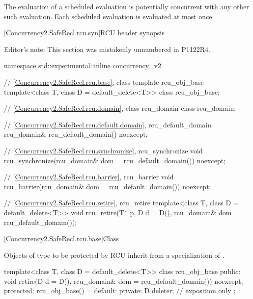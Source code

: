 \pnum
The evaluation of a scheduled evaluation is potentially concurrent with
any other such evaluation. Each scheduled evaluation is evaluated at
most once.

[Concurrency2.SafeRecl.rcu.syn]{RCU header  synopsis}

Editor's note: This section was mistakenly unnumbered in P1122R4.


\begin{codeblock}
namespace std::experimental::inline concurrency_v2 {
  // \ref{Concurrency2.SafeRecl.rcu.base}, class template rcu_obj_base
  template<class T, class D = default_delete<T>>
    class rcu_obj_base;

  // \ref{Concurrency2.SafeRecl.rcu.domain}, class rcu_domain
  class rcu_domain;

  // \ref{Concurrency2.SafeRecl.rcu.default.domain}, rcu_default_domain
  rcu_domain& rcu_default_domain() noexcept;

  // \ref{Concurrency2.SafeRecl.rcu.synchronize}, rcu_synchronize
  void rcu_synchronize(rcu_domain& dom = rcu_default_domain()) noexcept;

  // \ref{Concurrency2.SafeRecl.rcu.barrier}, rcu_barrier
  void rcu_barrier(rcu_domain& dom = rcu_default_domain()) noexcept;

  // \ref{Concurrency2.SafeRecl.rcu.retire}, rcu_retire
  template<class T, class D = default_delete<T>>
    void rcu_retire(T* p, D d = D(), rcu_domain& dom = rcu_default_domain());
}
\end{codeblock}

[Concurrency2.SafeRecl.rcu.base]{Class }


Objects of type  to be protected by RCU inherit from a
specialization of .


\begin{codeblock}
template<class T, class D = default_delete<T>>
class rcu_obj_base {
public:
  void retire(D d = D(), rcu_domain& dom = rcu_default_domain()) noexcept;
protected:
  rcu_obj_base() = default;
private:
  D deleter;  // exposition only
};
\end{codeblock}

